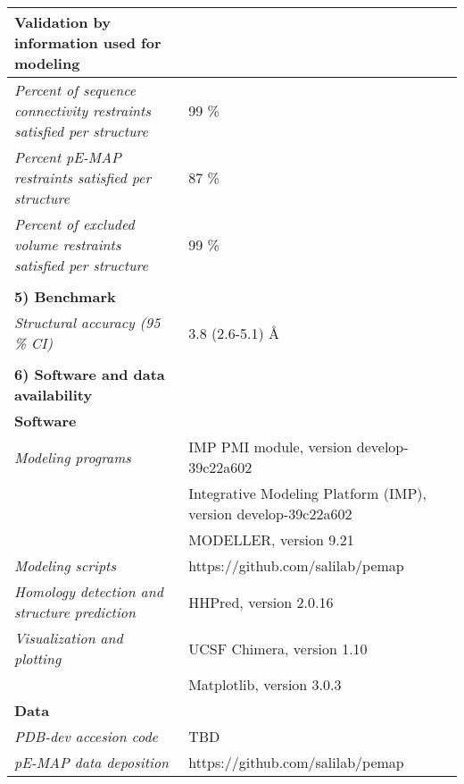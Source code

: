 \documentclass[8pt,a4paper]{article}
\begin{document}
\begin{longtable}{ p{} | p{} }
  \textbf{Validation by information used for modeling} & \\
  \hline
          \textit{Percent of sequence connectivity restraints satisfied per structure} & 99 \%\\
                \textit{Percent pE-MAP restraints satisfied per structure} & 87 \%\\
                \textit{Percent of excluded volume restraints satisfied per structure} & 99 \%\\
          &  \\
  
  \textbf{5) Benchmark} & \\
  \hline
          \textit{Structural accuracy (95 \% CI)} & 3.8 (2.6-5.1) \AA\\
          
   &  \\
  \normalsize{\textbf{6) Software and data availability}} & \\
    \hline
   \textbf{Software} & \\
   \hline
             \textit{Modeling programs} & IMP PMI module, version develop-39c22a602\\
             & Integrative Modeling Platform (IMP), version develop-39c22a602 \\
             & MODELLER, version 9.21 \\
                  \textit{Modeling scripts} & https://github.com/salilab/pemap\\
                  \textit{Homology detection and structure prediction} & HHPred, version 2.0.16\\
                  \textit{Visualization and plotting} & UCSF Chimera, version 1.10\\
             & Matplotlib, version 3.0.3  \\
          \hline

  \textbf{Data} & \\
    \hline
            \textit{PDB-dev accesion code} & TBD\\
                  \textit{pE-MAP data deposition} & https://github.com/salilab/pemap\\
          \hline
  
\end{longtable}
\end{document}
